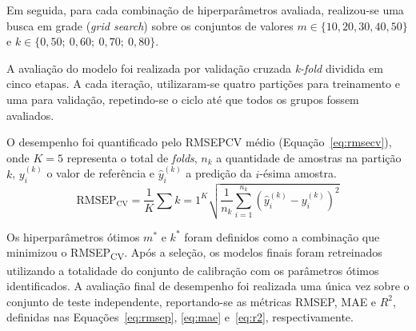 Em seguida, para cada combinação de hiperparâmetros avaliada, 
realizou-se uma busca em grade (\textit{grid search}) sobre os 
conjuntos de valores $m \in \{10, 20, 30, 40, 50\}$ e 
$k \in \{0{,}50;\ 0{,}60;\ 0{,}70;\ 0{,}80\}$.




A avaliação do modelo foi realizada por validação cruzada \textit{k-fold} dividida em cinco etapas. A cada iteração, utilizaram-se quatro partições para treinamento e uma para validação, repetindo-se o ciclo até que todos os grupos fossem avaliados.


O desempenho foi quantificado pelo \gls{RMSEPCV} médio (Equação~\ref{eq:rmsecv}), onde $K = 5$ representa o total de \textit{folds}, $n_k$ a quantidade de amostras na partição $k$, $y_i^{(k)}$ o valor de referência e $\hat{y}_i^{(k)}$ a predição da $i$-ésima amostra.\begin{equation}\label{eq:rmsecv}\text{RMSEP}_{\text{CV}} = \frac{1}{K} \sum{k=1}^{K}\sqrt{\frac{1}{n_k} \sum_{i=1}^{n_k}\left(\hat{y}_i^{(k)} - y_i^{(k)}\right)^2}\end{equation}%

Os hiperparâmetros ótimos $m^*$ e $k^*$ foram definidos como a 
combinação que minimizou o RMSEP\textsubscript{CV}. Após a seleção, 
os modelos finais foram retreinados utilizando a totalidade do 
conjunto de calibração com os parâmetros ótimos identificados. 
A avaliação final de desempenho foi realizada uma única vez sobre 
o conjunto de teste independente, reportando-se as métricas RMSEP, 
MAE e $R^2$, definidas nas Equações~\ref{eq:rmsep}, \ref{eq:mae} 
e~\ref{eq:r2}, respectivamente.

